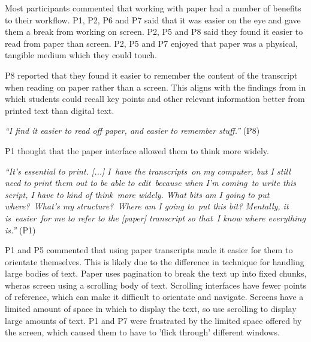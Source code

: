 
Most participants commented that working with paper had a number of benefits to their workflow. P1, P2, P6 and P7 said
that it was easier on the eye and gave them a break from working on screen. P2, P5 and P8 said they found it easier to
read from paper than screen. P2, P5 and P7 enjoyed that paper was a physical, tangible medium which they could touch.

P8 reported that they found it easier to remember the content of the transcript when reading on paper rather than a
screen.  This aligns with the findings from \citet{Singer2017} in which students could recall key points and other
relevant information better from printed text than digital text.




\textit{``I find it easier to read off paper, and easier to remember stuff.''} (P8)

P1 thought that the paper interface allowed them to think more widely.

\textit{``It's essential to print. [...]
  I have the transcripts on my computer, but I still need to print them out to be able to edit because when I'm
  coming to write this script, I have to kind of think more widely. What bits am I going to put where? What's my
  structure? Where am I going to put this bit? Mentally, it is easier for me to refer to the [paper] transcript so
that I know where everything is.''} (P1)


P1 and P5 commented that using paper transcripts made it easier for them to orientate themselves. This is likely due to
the difference in technique for handling large bodies of text. Paper uses pagination to break the text up into fixed
chunks, wheras screen using a scrolling body of text. Scrolling interfaces have fewer points of reference, which can
make it difficult to orientate and navigate.
Screens have a limited amount of space in which to display the text, so use scrolling to display large amounts of text.
P1 and P7 were frustrated by the limited space offered by the screen, which caused them to have to 'flick through'
different windows.

